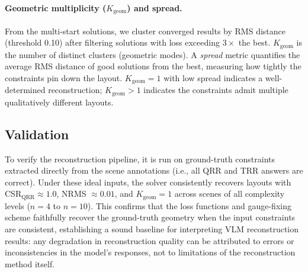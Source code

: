 \paragraph{Geometric multiplicity ($K_{\mathrm{geom}}$) and spread.}
From the multi-start solutions, we cluster converged results by RMS distance (threshold 0.10) after filtering solutions with loss exceeding $3\times$ the best. $K_{\mathrm{geom}}$ is the number of distinct clusters (geometric modes). A \emph{spread} metric quantifies the average RMS distance of good solutions from the best, measuring how tightly the constraints pin down the layout. $K_{\mathrm{geom}} = 1$ with low spread indicates a well-determined reconstruction; $K_{\mathrm{geom}} > 1$ indicates the constraints admit multiple qualitatively different layouts.

\subsection{Validation}
\label{sec:validation}

To verify the reconstruction pipeline, it is run on ground-truth constraints extracted directly from the scene annotations (i.e., all QRR and TRR answers are correct). Under these ideal inputs, the solver consistently recovers layouts with CSR$_{\mathrm{QRR}} \approx 1.0$, NRMS $\approx 0.01$, and $K_{\mathrm{geom}} = 1$ across scenes of all complexity levels ($n = 4$ to $n = 10$). This confirms that the loss functions and gauge-fixing scheme faithfully recover the ground-truth geometry when the input constraints are consistent, establishing a sound baseline for interpreting VLM reconstruction results: any degradation in reconstruction quality can be attributed to errors or inconsistencies in the model's responses, not to limitations of the reconstruction method itself.
